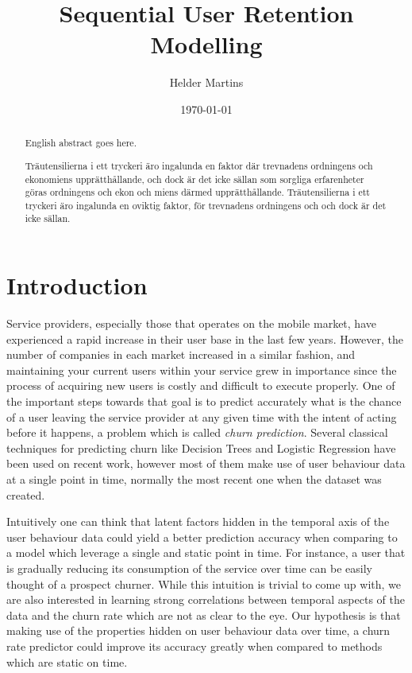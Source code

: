 \documentclass{kththesis}
\title{Sequential User Retention Modelling}
\author{Helder Martins}
\date{\today}
\begin{document}
\flyleaf

\begin{abstract}
  English abstract goes here.
  \lipsum[1-2]
\end{abstract}

\clearpage

\begin{otherlanguage}{swedish}
  \begin{abstract}
    Träutensilierna i ett tryckeri äro ingalunda en faktor där
    trevnadens ordningens och ekonomiens upprätthållande, och dock är
    det icke sällan som sorgliga erfarenheter göras ordningens och
    ekon och miens därmed upprätthållande. Träutensilierna i ett
    tryckeri äro ingalunda en oviktig faktor, för trevnadens
    ordningens och och dock är det icke sällan.
  \end{abstract}
\end{otherlanguage}

\cleardoublepage

\tableofcontents


\mainmatter


\chapter{Introduction}

    Service providers, especially those that operates on the mobile market, have experienced a rapid increase in their user base in the last few years. However, the number of companies in each market increased in a similar fashion, and maintaining your current users within your service grew in importance since the process of acquiring new users is costly and difficult to execute properly. One of the important steps towards that goal is to predict accurately what is the chance of a user leaving the service provider at any given time with the intent of acting before it happens, a problem which is called \emph{churn prediction}. Several classical techniques for predicting churn like Decision Trees and Logistic Regression have been used on recent work, however most of them make use of user behaviour data at a single point in time, normally the most recent one when the dataset was created. 
    
    Intuitively one can think that latent factors hidden in the temporal axis of the user behaviour data could yield a better prediction accuracy when comparing to a model which leverage a single and static point in time. For instance, a user that is gradually reducing its consumption of the service over time can be easily thought of a prospect churner. While this intuition is trivial to come up with, we are also interested in learning strong correlations between temporal aspects of the data and the churn rate which are not as clear to the eye. Our hypothesis is that making use of the properties hidden on user behaviour data over time, a churn rate predictor could improve its accuracy greatly when compared to methods which are static on time.
       
\end{document}
